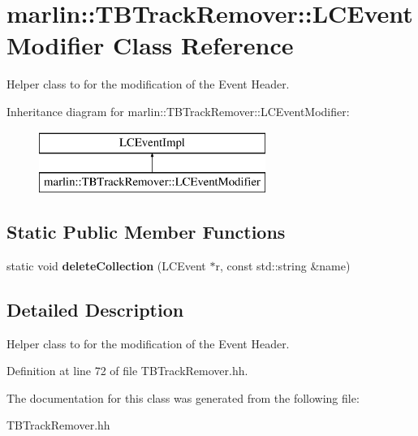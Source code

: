 \section{marlin\-:\-:T\-B\-Track\-Remover\-:\-:L\-C\-Event\-Modifier Class Reference}
\label{classmarlin_1_1TBTrackRemover_1_1LCEventModifier}


Helper class to for the modification of the Event Header.  


Inheritance diagram for marlin\-:\-:T\-B\-Track\-Remover\-:\-:L\-C\-Event\-Modifier\-:\begin{figure}[H]
\begin{center}
\leavevmode
\includegraphics[height=2.000000cm]{classmarlin_1_1TBTrackRemover_1_1LCEventModifier}
\end{center}
\end{figure}
\subsection*{Static Public Member Functions}
\begin{DoxyCompactItemize}
\item 
static void {\bfseries delete\-Collection} (L\-C\-Event $\ast$r, const std\-::string \&name)\label{classmarlin_1_1TBTrackRemover_1_1LCEventModifier_adac30a804a963f47f0da9dff12be6a12}

\end{DoxyCompactItemize}


\subsection{Detailed Description}
Helper class to for the modification of the Event Header. 

Definition at line 72 of file T\-B\-Track\-Remover.\-hh.



The documentation for this class was generated from the following file\-:\begin{DoxyCompactItemize}
\item 
T\-B\-Track\-Remover.\-hh\end{DoxyCompactItemize}
